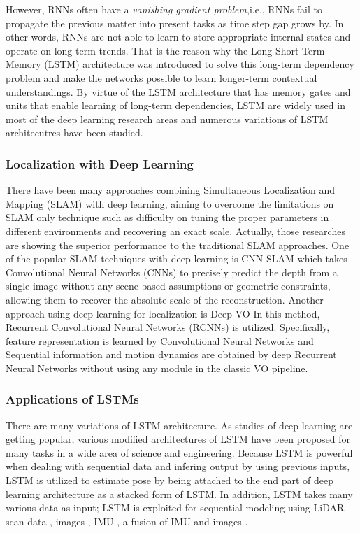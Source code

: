 \documentclass[letterpaper, 10 pt, conference]{ieeeconf}  %
\begin{document}
However, RNNs often have a \textit{vanishing gradient problem},i.e., RNNs fail to propagate the previous matter into present tasks as time step gap grows by. In other words, RNNs are not able to learn to store appropriate internal states and operate on long-term trends. That is the reason why the Long Short-Term Memory (LSTM) architecture was introduced to solve this long-term dependency problem and make the networks possible to learn longer-term contextual understandings\cite{hochreiter1997long}.
By virtue of the LSTM architecture that has memory gates and units that enable learning of long-term dependencies\cite{zaremba2014learning}, LSTM are widely used in most of the deep learning research areas and numerous variations of LSTM architecutres have been studied.

\subsubsection{Localization with Deep Learning}
There have been many approaches combining Simultaneous Localization and Mapping (SLAM) with deep learning, aiming to overcome the limitations on SLAM only technique such as difficulty on tuning the proper parameters in different environments and recovering an exact scale. Actually, those researches are showing the superior performance to the traditional SLAM approaches.
One of the popular SLAM techniques with deep learning is CNN-SLAM \cite{tateno2017cnn} which takes Convolutional Neural Networks (CNNs) to precisely predict the depth from a single image without any scene-based assumptions or geometric constraints, allowing them to recover the absolute scale of the reconstruction. Another approach using deep learning for localization is Deep VO \cite{clark2017vinet} In this method, Recurrent Convolutional Neural Networks (RCNNs) is utilized. Specifically, feature representation is learned by Convolutional Neural Networks and Sequential information and motion dynamics are obtained by deep Recurrent Neural Networks without using any module in the classic VO pipeline.



\subsubsection{Applications of LSTMs}

There are many variations of LSTM architecture. As studies of deep learning are getting popular, various modified architectures of LSTM have been proposed for many tasks in a wide area of science and engineering. Because LSTM is powerful when dealing with sequential data and infering output by using previous inputs, LSTM is utilized to estimate pose by being attached to the end part of deep learning architecture \cite{wang2017deepvo, kendall2015posenet, turan2018deep}  as a stacked form of LSTM. In addition, LSTM takes many various data as input; LSTM is exploited for sequential modeling using LiDAR scan data \cite{gladh2016deep}, images \cite{walch2017image, wang2017deepvo}, IMU \cite{ordonez2016deep}, a fusion of IMU and images \cite{clark2017vinet}.
\end{document}
